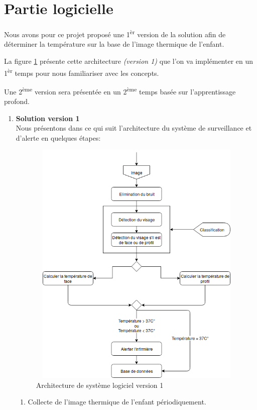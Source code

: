 \documentclass[12pt]{article}
\begin{document}
\newpage
\section{Partie logicielle}
Nous avons pour ce projet proposé une 1\textsuperscript{èr} version de la solution afin de déterminer la température sur la base de l'image thermique de l'enfant.

La figure \ref{fig:achdelasolu} présente cette architecture \textit{(version 1)} que l'on va implémenter en un 1\textsuperscript{èr} temps pour nous familiariser avec les concepts.

Une 2\textsuperscript{ème} version sera présentée en un 2\textsuperscript{ème} temps basée sur l'apprentissage profond.\\

\begin{enumerate}
	\item \textbf{Solution version 1}\\
	Nous présentons dans ce qui suit l'architecture du système de surveillance et d'alerte  en quelques étapes:
\begin{figure}[h]
	\centering
	\includegraphics[height=12cm,width=12cm]{img-Chapiter-3/Picture1.png}
	\caption{Architecture de système logiciel version 1}
	\label{fig:achdelasolu}
\end{figure}
\begin{enumerate}
	\item Collecte de l’image thermique de l’enfant périodiquement.

\end{enumerate}
\end{enumerate}
\end{document}
